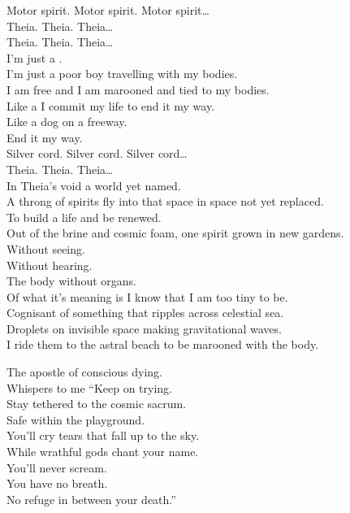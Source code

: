 
Motor spirit. Motor spirit. Motor spirit… \\

Theia. Theia. Theia… \\

Theia. Theia. Theia… \\

I'm just a . \\
I'm just a poor boy travelling with my bodies. \\
I am free and I am marooned and tied to my bodies. \\

Like a  I commit my life to end it my way. \\
Like a dog on a freeway. \\
End it my way. \\

Silver cord. Silver cord. Silver cord… \\

Theia. Theia. Theia… \\

In Theia's void a world yet named. \\
A throng of spirits fly into that space in space not yet replaced. \\
To build a life and be renewed. \\
Out of the brine and cosmic foam, one spirit grown in new gardens. \\
Without seeing. \\
Without hearing. \\
The body without organs. \\

Of what it's meaning is I know that I am too tiny to be. \\
Cognisant of something that ripples across celestial sea. \\
Droplets on invisible space making gravitational waves. \\
I ride them to the astral beach to be marooned with the body. \\



The apostle of conscious dying. \\
Whispers to me ``Keep on trying. \\
Stay tethered to the cosmic sacrum. \\
Safe within the  playground. \\
You'll cry tears that fall up to the sky. \\
While wrathful gods chant your name. \\
You'll never scream. \\
You have no breath. \\
No refuge in between your death.'' \\

